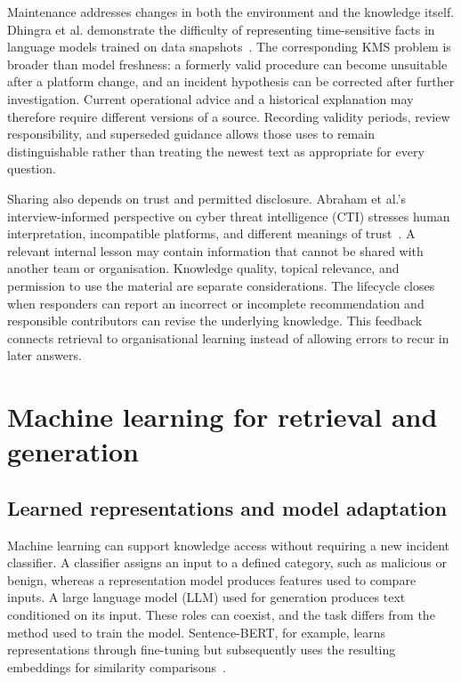 Maintenance addresses changes in both the environment and the knowledge itself. Dhingra et al. demonstrate the difficulty of representing time-sensitive facts in language models trained on data snapshots~\cite{ref060}. The corresponding KMS problem is broader than model freshness: a formerly valid procedure can become unsuitable after a platform change, and an incident hypothesis can be corrected after further investigation. Current operational advice and a historical explanation may therefore require different versions of a source. Recording validity periods, review responsibility, and superseded guidance allows those uses to remain distinguishable rather than treating the newest text as appropriate for every question.

Sharing also depends on trust and permitted disclosure. Abraham et al.'s interview-informed perspective on cyber threat intelligence (CTI) stresses human interpretation, incompatible platforms, and different meanings of trust~\cite{ref098}. A relevant internal lesson may contain information that cannot be shared with another team or organisation. Knowledge quality, topical relevance, and permission to use the material are separate considerations. The lifecycle closes when responders can report an incorrect or incomplete recommendation and responsible contributors can revise the underlying knowledge. This feedback connects retrieval to organisational learning instead of allowing errors to recur in later answers.

\section{Machine learning for retrieval and generation}
\subsection{Learned representations and model adaptation}
Machine learning can support knowledge access without requiring a new incident classifier. A classifier assigns an input to a defined category, such as malicious or benign, whereas a representation model produces features used to compare inputs. A large language model (LLM) used for generation produces text conditioned on its input. These roles can coexist, and the task differs from the method used to train the model. Sentence-BERT, for example, learns representations through fine-tuning but subsequently uses the resulting embeddings for similarity comparisons~\cite{reimers2019sentencebert}.

